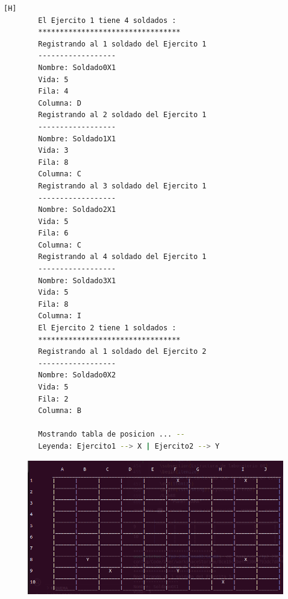 \documentclass{article}
\begin{document}
	\begin{lstlisting}[language=bash,caption={Ejecucion:}][H]
		El Ejercito 1 tiene 4 soldados : 
		*********************************
		Registrando al 1 soldado del Ejercito 1
		------------------
		Nombre: Soldado0X1
		Vida: 5
		Fila: 4
		Columna: D
		Registrando al 2 soldado del Ejercito 1
		------------------
		Nombre: Soldado1X1
		Vida: 3
		Fila: 8
		Columna: C
		Registrando al 3 soldado del Ejercito 1
		------------------
		Nombre: Soldado2X1
		Vida: 5
		Fila: 6
		Columna: C
		Registrando al 4 soldado del Ejercito 1
		------------------
		Nombre: Soldado3X1
		Vida: 5
		Fila: 8
		Columna: I
		El Ejercito 2 tiene 1 soldados : 
		*********************************
		Registrando al 1 soldado del Ejercito 2
		------------------
		Nombre: Soldado0X2
		Vida: 5
		Fila: 2
		Columna: B
				
		Mostrando tabla de posicion ... --
		Leyenda: Ejercito1 --> X | Ejercito2 --> Y

	\end{lstlisting}
	\begin{figure}[H]
		\centering
		\includegraphics[width=1.0\textwidth,keepaspectratio]{img/Commit3.png}
	\end{figure}
\end{document}
